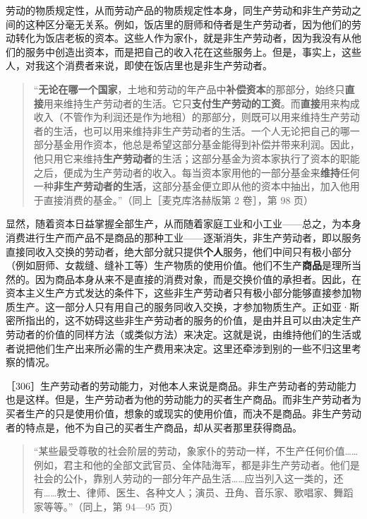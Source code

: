 劳动的物质规定性，从而劳动产品的物质规定性本身，同生产劳动和非生产劳动之间的这种区分毫无关系。例如，饭店里的厨师和侍者是生产劳动者，因为他们的劳动转化为饭店老板的资本。这些人作为家仆，就是非生产劳动者，因为我没有从他们的服务中创造出资本，而是把自己的收入花在这些服务上。但是，事实上，这些人，对我这个消费者来说，即使在饭店里也是非生产劳动者。

\begin{quote}“\textbf{无论在哪一个国家}，土地和劳动的年产品中\textbf{补偿资本}的那部分，始终只\textbf{直接}用来维持生产劳动者的生活。它只\textbf{支付生产劳动的工资}。而\textbf{直接}用来构成收入（不管作为利润还是作为地租）的那部分，则既可以用来维持生产劳动者的生活，也可以用来维持非生产劳动者的生活。一个人无论把自己的哪一部分基金用作资本，他总是希望这部分基金能得到补偿并带来利润。因此，他只用它来维持\textbf{生产劳动者}的生活；这部分基金为资本家执行了资本的职能之后，便成为生产劳动者的收入。每当资本家用他的一部分基金来\textbf{维持}任何一种\textbf{非生产劳动者的生活}，这部分基金便立即从他的资本中抽出，加入他用于直接消费的基金。”（同上［麦克库洛赫版第 2 卷］，第 98 页）\end{quote}

显然，随着资本日益掌握全部生产，从而随着家庭工业和小工业——总之，为本身消费进行生产而产品不是商品的那种工业——逐渐消失，非生产劳动者，即以服务直接同收入交换的劳动者，绝大部分就只提供\textbf{个人}服务，他们中间只有极小部分（例如厨师、女裁缝、缝补工等）生产物质的使用价值。他们不生产\textbf{商品}是理所当然的。因为商品本身从来不是直接的消费对象，而是交换价值的承担者。因此，在资本主义生产方式发达的条件下，这些非生产劳动者只有极小部分能够直接参加物质生产。这一部分人只有用自己的服务同收入交换，才参加物质生产。正如亚·斯密所指出的，这不妨碍这些非生产劳动者的服务的价值，是由并且可以由决定生产劳动者的价值的同样方法（或类似方法）来决定。这就是说，由维持他们的生活或者说把他们生产出来所必需的生产费用来决定。这里还牵涉到别的一些不归这里考察的情况。

［306］生产劳动者的劳动能力，对他本人来说是商品。非生产劳动者的劳动能力也是这样。但是，生产劳动者为他的劳动能力的买者生产商品。而非生产劳动者为买者生产的只是使用价值，想象的或现实的使用价值，而决不是商品。非生产劳动者的特点是，他不为自己的买者生产商品，却从买者那里获得商品。

\begin{quote}“某些最受尊敬的社会阶层的劳动，象家仆的劳动一样，不生产任何价值……例如，君主和他的全部文武官员、全体陆海军，都是非生产劳动者。他们是社会的公仆，靠别人劳动的一部分年产品生活……应当列入这一类的，还有……教士、律师、医生、各种文人；演员、丑角、音乐家、歌唱家、舞蹈家等等。”（同上，第 94—95 页）\end{quote}

